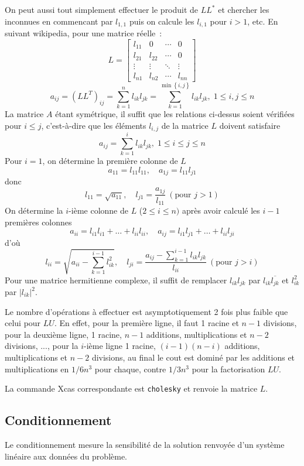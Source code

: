 \documentclass[a4paper,11pt]{article}
\begin{document}
\begin{giacjshere}
On peut aussi tout simplement effectuer le produit de $L L^*$ et
chercher les inconnues en commencant par $l_{1,1}$ puis on calcule
les $l_{i,1}$ pour $i>1$, etc. En suivant wikipedia, pour une matrice r\'eelle~:
\[ L=\begin{bmatrix}
l_{11}& 0 & \cdots & 0 \\
l_{21} & l_{22}& \cdots & 0\\
\vdots & \vdots & \ddots & \vdots\\
l_{n1} & l_{n2} & \cdots & l_{nn}
\end{bmatrix} \]
\[ a_{ij}=\left(LL^{T}\right)_{ij}={\sum_{k=1}^{n}l_{ik}l_{jk}}=
{\sum_{k=1}^{\min\left\{ i,j\right\} }l_{ik}l_{jk}},\;1\leq i,j\leq n \]
La matrice $A$ étant sym\'etrique, il suffit que les relations ci-dessus
soient v\'erifi\'ees pour $i \leq j$, 
c'est-à-dire que les \'el\'ements $l_{i,j}$ de la matrice $L$ doivent
satisfaire
\[ a_{ij}={\sum_{k=1}^{i}l_{ik}l_{jk}},\;1\leq i\leq j\leq n \]
Pour $i=1$, on d\'etermine la premi\`ere colonne de $L$
\[ a_{11}=l_{11}l_{11}, \quad a_{1j}=l_{11}l_{j1}\]
donc
\[ l_{11}=\sqrt{a_{11}}, \quad l_{j1}=\frac{a_{1j}}{l_{11}}
\ (\mbox{pour } j>1) \]
On d\'etermine la $i$-i\`eme colonne de $L$ ($2\leq i\leq n)$ apr\`es avoir
calculé les $i-1$ premi\`eres colonnes
\[ a_{ii}=l_{i1}l_{i1}+\ldots+l_{ii}l_{ii}, \quad
a_{ij}=l_{i1}l_{j1}+\ldots+l_{ii}l_{ji} \]
d'où 
\[ l_{ii}= \sqrt{{a_{ii}-{\sum_{k=1}^{i-1}l_{ik}^{2}}}}, \quad
l_{ji}=\frac{a_{ij}-{\sum_{k=1}^{i-1}l_{ik}l_{jk}}}{l_{ii}} \
(\mbox{pour } j > i)\]
Pour une matrice hermitienne complexe, il suffit de remplacer
$l_{ik}l_{jk}$ par $l_{ik}\overline{l_{jk}}$ et $l_{ik}^{2}$ par
$|l_{ik}|^{2}$.

Le nombre d'op\'erations \`a effectuer est asymptotiquement
2 fois plus faible que celui pour $LU$. En effet,
pour la premi\`ere ligne, il faut 1 racine et $n-1$ divisions,
pour la deuxi\`eme ligne, 1 racine, $n-1$ additions, multiplications
et $n-2$ divisions, ..., pour la $i$-i\`eme ligne 1 racine,
$(i-1)(n-i)$ additions, multiplications et $n-2$ divisions, au final
le cout est domin\'e par les additions et multiplications en $1/6n^3$
pour chaque, contre $1/3n^3$ pour la
factorisation $LU$.

La commande Xcas correspondante est \verb|cholesky| et renvoie
la matrice $L$.

\subsection{Conditionnement}  
Le conditionnement mesure la sensibilit\'e de la solution renvoy\'ee d'un
syst\`eme lin\'eaire aux donn\'ees du probl\`eme.


\end{giacjshere}
\end{document}
